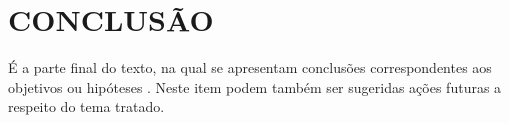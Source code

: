 \chapter{CONCLUS\~AO}
\label{chap:conclusao}
\thispagestyle{plain}
É a parte final do texto, na qual se apresentam conclusões correspondentes aos
objetivos ou hipóteses \cite[p.6]{NBR14724:2005}. Neste item podem também ser sugeridas ações
futuras a respeito do tema tratado.
